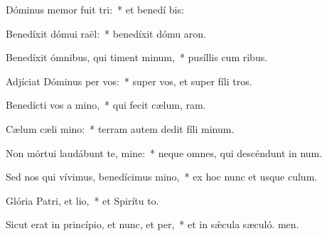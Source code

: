 \item Dóminus memor fuit tri:~* et benedí bis:
\item Benedíxit dómui raël:~* benedíxit dómu aron.
\item Benedíxit ómnibus, qui timent minum,~* pusíllis cum ribus.
\item Adjíciat Dóminus per vos:~* super vos, et super fíli tros.
\item Benedícti vos a mino,~* qui fecit cælum,  ram.
\item Cælum cæli mino:~* terram autem dedit fíli minum.
\item Non mórtui laudábunt te, mine:~* neque omnes, qui descéndunt in num.
\item Sed nos qui vívimus, benedícimus mino,~* ex hoc nunc et usque  culum.
\item Glória Patri, et lio,~* et Spirítu to.
\item Sicut erat in princípio, et nunc, et per,~* et in sǽcula sæculó. men.
